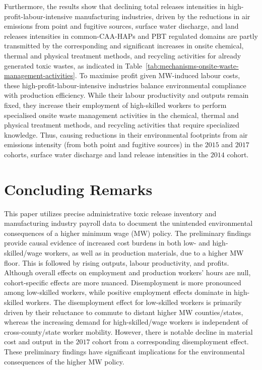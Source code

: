 \documentclass[12pt, english]{article}
\begin{document}
    Furthermore, the results show that declining total releases intensities in high-profit-labour-intensive manufacturing industries, driven by the reductions in air emissions from point and fugitive sources, surface water discharge, and land releases intensities in common-CAA-HAPs and PBT regulated domains are partly transmitted by the corresponding and significant increases in onsite chemical, thermal and physical treatment methods, and recycling activities for already generated toxic wastes, as indicated in Table~\ref{tab:mechanisms-onsite-waste-management-activities}. To maximise profit given MW-induced labour costs, these high-profit-labour-intensive industries balance environmental compliance with production efficiency. While their labour productivity and outputs remain fixed, they increase their employment of high-skilled workers to perform specialised onsite waste management activities in the chemical, thermal and physical treatment methods, and recycling activities that require specialized knowledge. Thus, causing reductions in their environmental footprints from air emissions intensity (from both point and fugitive sources) in the $2015$ and $2017$ cohorts, surface water discharge and land release intensities in the $2014$ cohort.


    \section{Concluding Remarks}\label{sec:concluding-remarks}
    This paper utilizes precise administrative toxic release inventory and manufacturing industry payroll data to document the unintended environmental consequences of a higher minimum wage (MW) policy. The preliminary findings provide causal evidence of increased cost burdens in both low- and high-skilled/wage workers, as well as in production materials, due to a higher MW floor. This is followed by rising outputs, labour productivity, and profits. Although overall effects on employment and production workers' hours are null, cohort-specific effects are more nuanced. Disemployment is more pronounced among low-skilled workers, while positive employment effects dominate in high-skilled workers. The disemployment effect for low-skilled workers is primarily driven by their reluctance to commute to distant higher MW counties/states, whereas the increasing demand for high-skilled/wage workers is independent of cross-county/state worker mobility. However, there is notable decline in material cost and output in the $2017$ cohort from a corresponding disemployment effect. These preliminary findings have significant implications for the environmental consequences of the higher MW policy.
\end{document}
